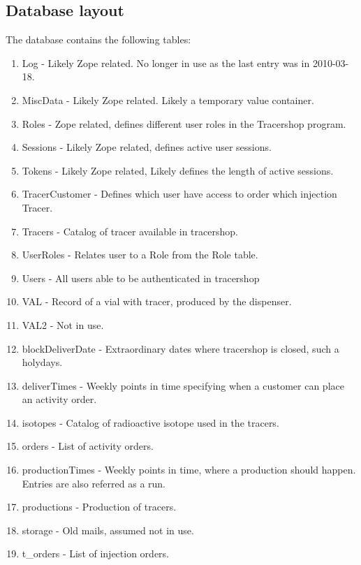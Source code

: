 \documentclass{article}
\begin{document}
\subsection*{Database layout}
The database contains the following tables:
\begin{enumerate}
  \item Log - Likely Zope related. No longer in use as the last entry was in
  2010-03-18.
  \item MiscData - Likely Zope related. Likely a temporary value container.
  \item Roles - Zope related, defines different user roles in the Tracershop
  program.
  \item Sessions - Likely Zope related, defines active user sessions.
  \item Tokens - Likely Zope related, Likely defines the length of active
  sessions.
  \item TracerCustomer - Defines which user have access to order which injection
  Tracer.
  \item Tracers - Catalog of tracer available in tracershop.
  \item UserRoles - Relates user to a Role from the Role table.
  \item Users - All users able to be authenticated in tracershop
  \item VAL - Record of a vial with tracer, produced by the dispenser.
  \item VAL2 - Not in use.
  \item blockDeliverDate - Extraordinary dates where tracershop is closed, such
  a holydays.
  \item deliverTimes - Weekly points in time specifying when a customer can
  place an activity order.
  \item isotopes - Catalog of radioactive isotope used in the tracers.
  \item orders - List of activity orders.
  \item productionTimes - Weekly points in time, where a production should
  happen. Entries are also referred as a run.
  \item productions - Production of tracers.
  \item storage - Old mails, assumed not in use.
  \item t\_orders - List of injection orders.
\end{enumerate}
\end{document}
